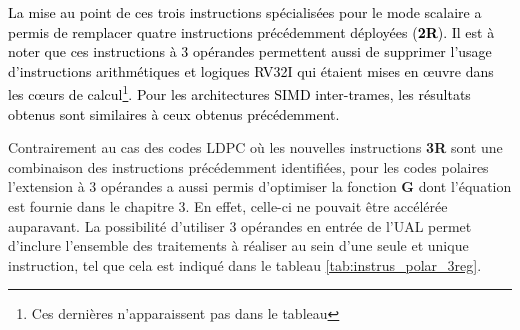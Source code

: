 \documentclass[../main.tex]{subfiles}
\begin{document}
\textcolor{black}{La mise au point de ces trois instructions spécialisées pour le mode scalaire a permis de remplacer quatre instructions précédemment déployées (\textbf{2R}).
Il est à noter que ces instructions à 3 opérandes permettent aussi de supprimer l'usage d'instructions arithmétiques et logiques RV32I qui étaient mises en œuvre dans les cœurs de calcul\footnote{Ces dernières n'apparaissent pas dans le tableau}.
Pour les architectures SIMD inter-trames, les résultats obtenus sont similaires à ceux obtenus précédemment.}

Contrairement au cas des codes LDPC où les nouvelles instructions \textbf{3R} sont une combinaison des instructions précédemment identifiées, pour les codes polaires l'extension à 3 opérandes a aussi permis d'optimiser la fonction \textbf{G} dont l'équation est fournie dans le chapitre 3.
En effet, celle-ci ne pouvait être accélérée auparavant.
La possibilité d'utiliser 3 opérandes en entrée de l'UAL permet d'inclure l'ensemble des traitements à réaliser au sein d'une seule et unique instruction, tel que cela est indiqué dans le tableau \ref{tab:instrus_polar_3reg}.
\end{document}

